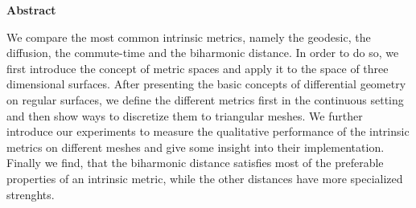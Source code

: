 

\clearemptydoublepage
{}
{}





\vspace*{2cm}
\begin{center}
{\Large \bfseries Abstract}
\end{center}
\vspace{1cm}

We compare the most common intrinsic metrics, namely the geodesic, the diffusion, the commute-time and the biharmonic distance.
In order to do so, we first introduce the concept of metric spaces and apply it to the space of three dimensional surfaces.
After presenting the basic concepts of differential geometry on regular surfaces, we define the different metrics first in the continuous setting and then show ways to discretize them to triangular meshes.
We further introduce our experiments to measure the qualitative performance of the intrinsic metrics on different meshes and give some insight into their implementation.
Finally we find, that the biharmonic distance satisfies most of the preferable properties of an intrinsic metric, while the other distances have more specialized strenghts.

